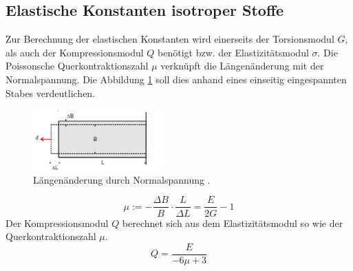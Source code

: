 \subsection{Elastische Konstanten isotroper Stoffe}
Zur Berechnung der elastischen Konstanten wird einerseits der Torsionsmodul $G$, als auch der Kompressionsmodul $Q$ benötigt bzw. der Elastizitätsmodul $\sigma$.
Die Poissonsche Querkontraktionszahl $\mu$ verknüpft die Längenänderung mit der Normalspannung. Die Abbildung \ref{fig:poisson} soll dies anhand eines einseitig eingespannten Stabes verdeutlichen.
\begin{figure}
  \centering
  \includegraphics[width=5.0cm]{./picture/poisson.png}
  \caption{Längenänderung durch Normalspannung \cite{sample}.}
  \label{fig:poisson}
\end{figure}
\begin{equation}
  \mu := -\frac{\Delta B}{B} \cdot \frac{L}{\Delta L} = \frac{E}{2G} - 1
  \label{eqn:pois}
\end{equation}
Der Kompressionsmodul $Q$ berechnet sich aus dem Elastizitätsmodul so wie der Querkontraktionszahl $\mu$.
\begin{equation}
  Q = \frac{E}{-6 \mu + 3}
  \label{eqn:komp}
\end{equation}

